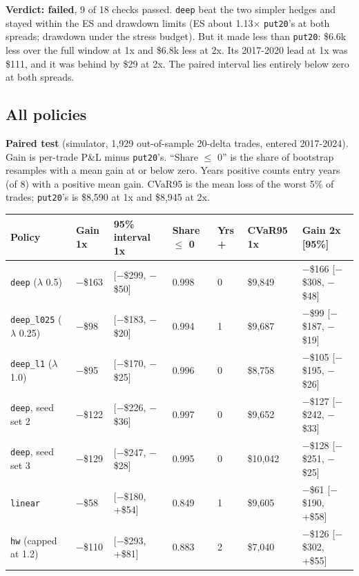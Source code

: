 \documentclass{article}
\begin{document}
\textbf{Verdict: failed}, 9 of 18 checks passed. \texttt{deep} beat the two simpler hedges and stayed within the ES and drawdown limits (ES about 1.13\ensuremath{\times} \texttt{put20}'s at both spreads; drawdown under the stress budget). But it made less than \texttt{put20}: \$6.6k less over the full window at 1x and \$6.8k less at 2x. Its 2017-2020 lead at 1x was \$111, and it was behind by \$29 at 2x. The paired interval lies entirely below zero at both spreads.

\subsection{All policies}

\textbf{Paired test} (simulator, 1,929 out-of-sample 20-delta trades, entered 2017-2024). Gain is per-trade P\&L minus \texttt{put20}'s. ``Share \ensuremath{\leq} 0'' is the share of bootstrap resamples with a mean gain at or below zero. Years positive counts entry years (of 8) with a positive mean gain. CVaR95 is the mean loss of the worst 5\% of trades; \texttt{put20}'s is \$8,590 at 1x and \$8,945 at 2x.

\begin{center}\small
\begin{tabularx}{\linewidth}{>{\raggedright\arraybackslash}X l l l l l l}
\toprule
\textbf{Policy} & \textbf{Gain 1x} & \textbf{95\% interval 1x} & \textbf{Share \ensuremath{\leq} 0} & \textbf{Yrs +} & \textbf{CVaR95 1x} & \textbf{Gain 2x [95\%]} \\
\midrule
\texttt{deep} (\ensuremath{\lambda} 0.5) & $-$\$163 & [$-$\$299, $-$\$50] & 0.998 & 0 & \$9,849 & $-$\$166 [$-$\$308, $-$\$48] \\
\texttt{deep\_\allowbreak{}l025} (\ensuremath{\lambda} 0.25) & $-$\$98 & [$-$\$183, $-$\$20] & 0.994 & 1 & \$9,687 & $-$\$99 [$-$\$187, $-$\$19] \\
\texttt{deep\_\allowbreak{}l1} (\ensuremath{\lambda} 1.0) & $-$\$95 & [$-$\$170, $-$\$25] & 0.996 & 0 & \$8,758 & $-$\$105 [$-$\$195, $-$\$26] \\
\texttt{deep}, seed set 2 & $-$\$122 & [$-$\$226, $-$\$36] & 0.997 & 0 & \$9,652 & $-$\$127 [$-$\$242, $-$\$33] \\
\texttt{deep}, seed set 3 & $-$\$129 & [$-$\$247, $-$\$28] & 0.995 & 0 & \$10,042 & $-$\$128 [$-$\$251, $-$\$25] \\
\texttt{linear} & $-$\$58 & [$-$\$180, +\$54] & 0.849 & 1 & \$9,605 & $-$\$61 [$-$\$190, +\$58] \\
\texttt{hw} (capped at 1.2) & $-$\$110 & [$-$\$293, +\$81] & 0.883 & 2 & \$7,040 & $-$\$126 [$-$\$302, +\$55] \\
\bottomrule
\end{tabularx}
\end{center}
\end{document}
